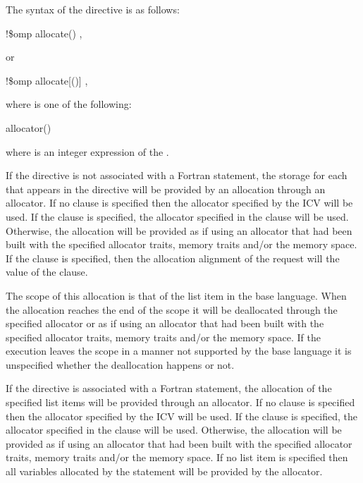 \begin{fortranspecific}
\fortranspecificstart
The syntax of the  directive is as follows:

\begin{boxedcode}
!\$omp allocate() \plc{[clause[ [ [},\plc{] clause] ... ]]}
\end{boxedcode}

or
\begin{boxedcode}
!\$omp allocate[()] \plc{clause[ [ [},\plc{] clause] ... ]}
\end{boxedcode}

where  is one of the following:

\begin{indentedcodelist}
allocator()
\end{indentedcodelist}

where  is an integer expression of the  .

\end{fortranspecific}

\descr

If the directive is not associated with a Fortran  statement, the storage for each  that appears in the directive will be provided by an allocation through an allocator. If no clause is specified then the allocator specified by the  ICV will be used. If the  clause is specified, the allocator specified in the clause will be used. Otherwise, the allocation will be provided as if using an allocator that had been built with the specified allocator traits, memory traits and/or the  memory space. If the  clause is specified, then the allocation alignment of the request will the value of the  clause.

The scope of this allocation is that of the list item in the base language. When the allocation reaches the end of the scope it will be deallocated through the specified allocator or as if using an allocator that had been built with the specified allocator traits, memory traits and/or the  memory space. If the execution leaves the scope in a manner not supported by the base language it is unspecified whether the deallocation happens or not.

\begin{fortranspecific}
If the directive is associated with a Fortran  statement, the allocation of the specified list items will be provided through an allocator. If no clause is specified then the allocator specified by the  ICV will be used. If the  clause is specified, the allocator specified in the clause will be used. Otherwise, the allocation will be provided as if using an allocator that had been built with the specified allocator traits, memory traits and/or the  memory space. If no list item is specified then all variables allocated by the  statement will be provided by the allocator.
\end{fortranspecific}

